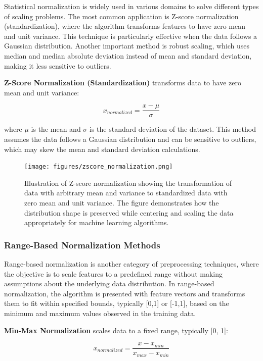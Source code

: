 Statistical normalization is widely used in various domains to solve different types of scaling problems. The most common application is Z-score normalization (standardization), where the
algorithm transforms features to have zero mean and unit variance. This technique is particularly effective when the data follows a Gaussian distribution. Another important method is robust
scaling, which uses median and median absolute deviation instead of mean and standard deviation, making it less sensitive to outliers.

\textbf{Z-Score Normalization (Standardization)} transforms data to have zero mean and unit variance:

\begin{equation}
x_{normalized} = \frac{x - \mu}{\sigma}
\end{equation}

where $\mu$ is the mean and $\sigma$ is the standard deviation of the dataset. This method assumes the data follows a Gaussian distribution and can be sensitive to outliers, which may skew the
mean and standard deviation calculations.

\begin{figure}[htbp]
  \centering
  \texttt{[image: figures/zscore\_normalization.png]}
  \caption{Illustration of Z-score normalization showing the transformation of data with arbitrary mean and variance to standardized data with zero mean and unit variance. The figure
demonstrates how the distribution shape is preserved while centering and scaling the data appropriately for machine learning algorithms.}
  \label{fig:zscore_norm}
\end{figure}

\subsubsection{Range-Based Normalization Methods}

Range-based normalization is another category of preprocessing techniques, where the objective is to scale features to a predefined range without making assumptions about the underlying data
distribution. In range-based normalization, the algorithm is presented with feature vectors and transforms them to fit within specified bounds, typically [0,1] or [-1,1], based on the minimum and
maximum values observed in the training data.

\textbf{Min-Max Normalization} scales data to a fixed range, typically [0, 1]:

\begin{equation}
x_{normalized} = \frac{x - x_{min}}{x_{max} - x_{min}}
\end{equation}

